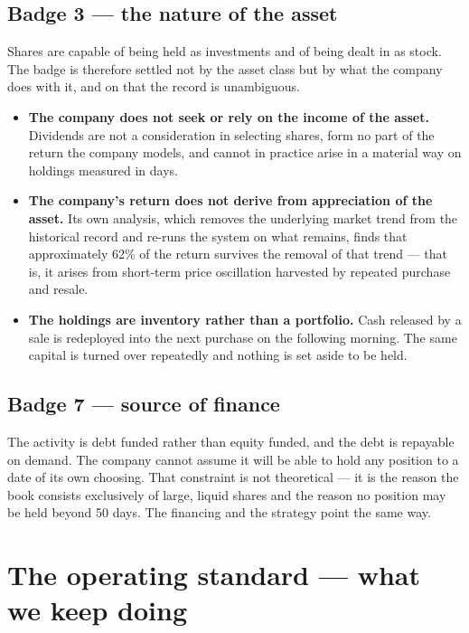 \documentclass[11pt]{article}
\begin{document}
\subsection{Badge 3 --- the nature of the asset}

Shares are capable of being held as investments and of being dealt in as stock. The badge is
therefore settled not by the asset class but by what the company does with it, and on that the
record is unambiguous.

\begin{itemize}[leftmargin=1.4em,itemsep=0.2em]
\item \textbf{The company does not seek or rely on the income of the asset.} Dividends are not a
      consideration in selecting shares, form no part of the return the company models, and cannot
      in practice arise in a material way on holdings measured in days.
\item \textbf{The company's return does not derive from appreciation of the asset.} Its own
      analysis, which removes the underlying market trend from the historical record and re-runs
      the system on what remains, finds that approximately 62\% of the return survives the removal
      of that trend --- that is, it arises from short-term price oscillation harvested by repeated
      purchase and resale.
\item \textbf{The holdings are inventory rather than a portfolio.} Cash released by a sale is
      redeployed into the next purchase on the following morning. The same capital is turned over
      repeatedly and nothing is set aside to be held.
\end{itemize}

\subsection{Badge 7 --- source of finance}

The activity is debt funded rather than equity funded, and the debt is repayable on demand. The
company cannot assume it will be able to hold any position to a date of its own choosing. That
constraint is not theoretical --- it is the reason the book consists exclusively of large, liquid
shares and the reason no position may be held beyond 50 days. The financing and the strategy point
the same way.

\section{The operating standard --- what we keep doing}
\end{document}
